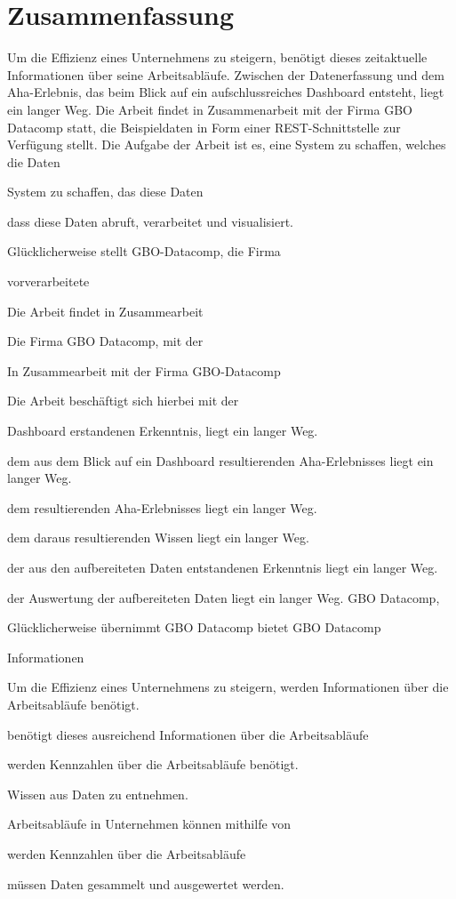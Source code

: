 \chapter*{Zusammenfassung}
\label{chap:zusammenfassung}

Um die Effizienz eines Unternehmens zu steigern, benötigt dieses zeitaktuelle Informationen über seine Arbeitsabläufe.
Zwischen der Datenerfassung und dem Aha-Erlebnis, das beim Blick auf ein aufschlussreiches Dashboard entsteht, liegt ein
langer Weg. Die Arbeit findet in Zusammenarbeit mit der Firma GBO Datacomp statt, die Beispieldaten
in Form einer REST-Schnittstelle zur Verfügung stellt. Die Aufgabe der Arbeit ist es, eine System zu schaffen,
welches die Daten 



System zu schaffen,
das diese Daten 


dass diese Daten abruft, verarbeitet und visualisiert.


Glücklicherweise stellt GBO-Datacomp, die Firma 


vorverarbeitete 


Die Arbeit findet in Zusammearbeit 


Die Firma GBO Datacomp, mit der 


In Zusammearbeit mit der Firma GBO-Datacomp 


Die Arbeit beschäftigt sich hierbei mit der 


Dashboard erstandenen Erkenntnis, liegt ein langer Weg.



dem aus dem Blick auf ein Dashboard resultierenden Aha-Erlebnisses liegt ein langer Weg.


dem resultierenden Aha-Erlebnisses liegt ein langer Weg.


dem daraus resultierenden Wissen liegt ein langer Weg.


der aus den aufbereiteten Daten entstandenen Erkenntnis liegt ein langer Weg.


der Auswertung der aufbereiteten Daten liegt ein langer Weg. GBO Datacomp,




Glücklicherweise
übernimmt GBO Datacomp 
bietet GBO Datacomp 


Informationen

Um die Effizienz eines Unternehmens zu steigern, werden Informationen über die Arbeitsabläufe benötigt.



benötigt dieses ausreichend Informationen über die Arbeitsabläufe


werden Kennzahlen über die Arbeitsabläufe benötigt.

Wissen aus Daten zu entnehmen.

Arbeitsabläufe in Unternehmen können mithilfe von 

 werden Kennzahlen über die Arbeitsabläufe 



müssen Daten gesammelt und ausgewertet werden.
